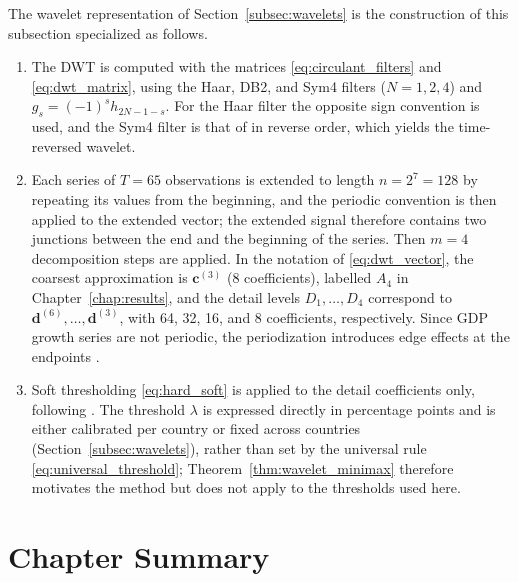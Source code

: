 The wavelet representation of Section~\ref{subsec:wavelets} is the
construction of this subsection specialized as follows.
\begin{enumerate}
\item The DWT is computed with the matrices \eqref{eq:circulant_filters} and
\eqref{eq:dwt_matrix}, using the Haar, DB2, and Sym4 filters
($N = 1, 2, 4$) and $g_s = (-1)^sh_{2N-1-s}$. For the Haar filter the opposite sign convention is used, and the Sym4
filter is that of \cite[Table~3.4]{vidakovic1999} in reverse order, which yields the time-reversed wavelet.
\item Each series of $T = 65$ observations is extended to length
$n = 2^7 = 128$ by repeating its values from the beginning, and the periodic
convention is then applied to the extended vector; the extended signal
therefore contains two junctions between the end and the beginning of the
series. Then $m = 4$ decomposition steps are applied. In the notation of \eqref{eq:dwt_vector},
the coarsest approximation is $\mathbf{c}^{(3)}$ (8 coefficients), labelled
$A_4$ in Chapter~\ref{chap:results}, and the detail levels
$D_1,\dots,D_4$ correspond to $\mathbf{d}^{(6)},\dots,\mathbf{d}^{(3)}$, with
64, 32, 16, and 8 coefficients, respectively. Since GDP growth series are not periodic, the periodization introduces edge
effects at the endpoints \cite[Sec.~5.6]{vidakovic1999}.
\item Soft thresholding \eqref{eq:hard_soft} is applied to the detail
coefficients only, following \cite[Sec.~6.1]{vidakovic1999}. The threshold $\lambda$ is expressed directly
in percentage points and is either calibrated per country or fixed across
countries (Section~\ref{subsec:wavelets}), rather than set by the universal
rule \eqref{eq:universal_threshold}; Theorem~\ref{thm:wavelet_minimax}
therefore motivates the method but does not apply to the thresholds used
here.
\end{enumerate}

\section{Chapter Summary}
\label{sec:theory_summary}

